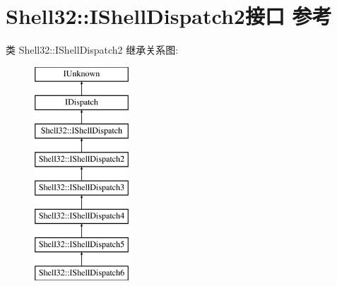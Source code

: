 \hypertarget{interface_shell32_1_1_i_shell_dispatch2}{}\section{Shell32\+:\+:I\+Shell\+Dispatch2接口 参考}
\label{interface_shell32_1_1_i_shell_dispatch2}
类 Shell32\+:\+:I\+Shell\+Dispatch2 继承关系图\+:\begin{figure}[H]
\begin{center}
\leavevmode
\includegraphics[height=8.000000cm]{interface_shell32_1_1_i_shell_dispatch2}
\end{center}
\end{figure}
